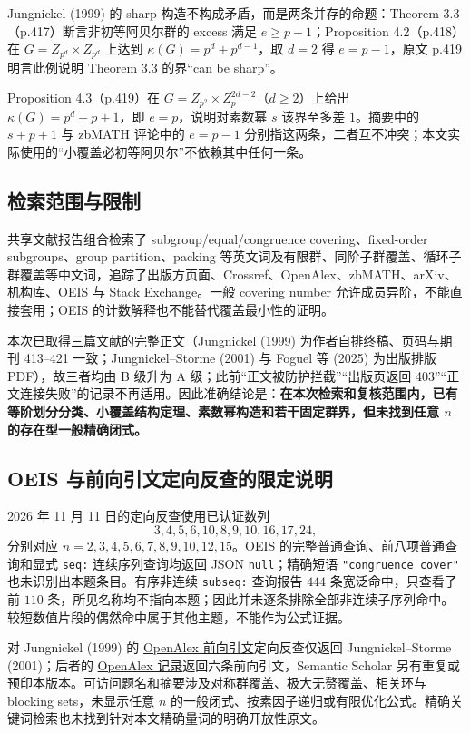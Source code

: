 \documentclass[11pt,a4paper]{article}
\numberwithin{equation}{section}
\theoremstyle{plain}
\theoremstyle{definition}
\theoremstyle{remark}
\begin{document}
Jungnickel (1999) 的 sharp 构造不构成矛盾，而是两条并存的命题：Theorem 3.3（p.417）断言非初等阿贝尔群的 excess 满足 $e\ge p-1$；Proposition 4.2（p.418）在 $G=Z_{p^d}\times Z_{p^d}$ 上达到 $\kappa(G)=p^d+p^{d-1}$，取 $d=2$ 得 $e=p-1$，原文 p.419 明言此例说明 Theorem 3.3 的界“can be sharp”。 

Proposition 4.3（p.419）在 $G=Z_{p^2}\times Z_p^{2d-2}$（$d\ge2$）上给出 $\kappa(G)=p^d+p+1$，即 $e=p$，说明对素数幂 $s$ 该界至多差 $1$。摘要中的 $s+p+1$ 与 zbMATH 评论中的 $e=p-1$ 分别指这两条，二者互不冲突；本文实际使用的“小覆盖必初等阿贝尔”不依赖其中任何一条。

\subsection{检索范围与限制}
共享文献报告组合检索了 subgroup/equal/congruence covering、fixed-order subgroups、group partition、packing 等英文词及有限群、同阶子群覆盖、循环子群覆盖等中文词，追踪了出版方页面、Crossref、OpenAlex、zbMATH、arXiv、机构库、OEIS 与 Stack Exchange。一般 covering number 允许成员异阶，不能直接套用；OEIS 的计数解释也不能替代覆盖最小性的证明。

本次已取得三篇文献的完整正文（Jungnickel (1999) 为作者自排终稿、页码与期刊 413--421 一致；Jungnickel--Storme (2001) 与 Foguel 等 (2025) 为出版排版 PDF），故三者均由 B 级升为 A 级；此前“正文被防护拦截”“出版页返回 403”“正文连接失败”的记录不再适用。因此准确结论是：\textbf{在本次检索和复核范围内，已有等阶划分分类、小覆盖结构定理、素数幂构造和若干固定群界，但未找到任意 $n$ 的存在型一般精确闭式。}

\subsection{OEIS 与前向引文定向反查的限定说明}\label{sec:sequence-lookup}
2026 年 11 月 11 日的定向反查使用已认证数列
\begin{equation}
 3,4,5,6,10,8,9,10,16,17,24,
\end{equation}
分别对应 $n=2,3,4,5,6,7,8,9,10,12,15$。OEIS 的完整普通查询、前八项普通查询和显式 \texttt{seq:} 连续序列查询均返回 JSON \texttt{null}；精确短语 \texttt{"congruence cover"} 也未识别出本题条目。有序非连续 \texttt{subseq:} 查询报告 $444$ 条宽泛命中，只查看了前 $110$ 条，所见名称均不指向本题；因此并未逐条排除全部非连续子序列命中。较短数值片段的偶然命中属于其他主题，不能作为公式证据。

对 Jungnickel (1999) 的 \href{https://openalex.org/W1603700654}{OpenAlex 前向引文}定向反查仅返回 Jungnickel--Storme (2001)；后者的 \href{https://openalex.org/W2083823125}{OpenAlex 记录}返回六条前向引文，Semantic Scholar 另有重复或预印本版本。可访问题名和摘要涉及对称群覆盖、极大无赘覆盖、相关环与 blocking sets，未显示任意 $n$ 的一般闭式、按素因子递归或有限优化公式。精确关键词检索也未找到针对本文精确量词的明确开放性原文。
\end{document}
